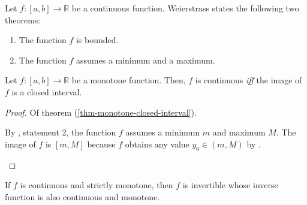 \begin{thm}\label{thm-weierstrass-theorems}
	Let $f:[a,b]\to\mathbb{R}$ be a continuous function. Weierstrass states the
	following two theorems:
	\begin{enumerate}
		\item The function $f$ is bounded.
		\item The function $f$ assumes a minimum and a maximum.
	\end{enumerate}
\end{thm}

\begin{thm}\label{thm-monotone-closed-interval}
	Let $f:[a,b]\to\mathbb{R}$ be a monotone function. Then, $f$ is continuous
	\textit{iff} the image of $f$ is a closed interval.
\end{thm}

\begin{proof}
	Of theorem (\ref{thm-monotone-closed-interval}).
	\begin{flushleft}
		By , statement 2, the function $f$
		assumes a minimum $m$ and maximum $M$. The image of $f$ is $[m,M]$ because
		$f$ obtains any value $y_0\in(m,M)$ by .
	\end{flushleft}
\end{proof}

\begin{thm}\label{thm-continuous-monotone-invertible}
	If $f$ is continuous and strictly monotone, then $f$ is invertible whose
	inverse function is also continuous and monotone.
\end{thm}
